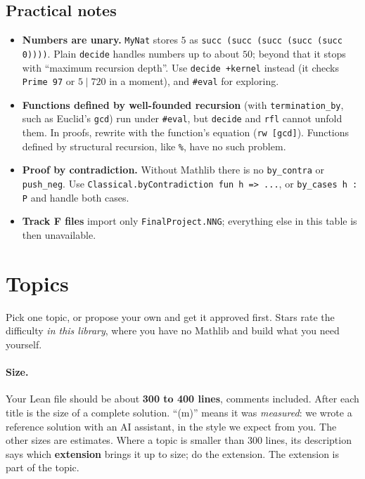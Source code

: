 \documentclass[11pt]{article}
\newcommand{\lean}[1]{\texttt{#1}}
\newcommand{\dvd}{\ensuremath{\mid}}
\begin{document}
\subsection{Practical notes}
\begin{itemize}
\item \textbf{Numbers are unary.} \lean{MyNat} stores $5$ as \lean{succ (succ (succ (succ (succ 0))))}.
  Plain \lean{decide} handles numbers up to about $50$; beyond that it stops with ``maximum
  recursion depth''. Use \lean{decide +kernel} instead (it checks \lean{Prime 97} or
  $5 \dvd 720$ in a moment), and \lean{\#eval} for exploring.
\item \textbf{Functions defined by well-founded recursion} (with \lean{termination\_by}, such as
  Euclid's \lean{gcd}) run under \lean{\#eval}, but \lean{decide} and \lean{rfl} cannot unfold
  them. In proofs, rewrite with the function's equation (\lean{rw [gcd]}). Functions defined by
  structural recursion, like \lean{\%}, have no such problem.
\item \textbf{Proof by contradiction.} Without Mathlib there is no \lean{by\_contra} or
  \lean{push\_neg}. Use \lean{Classical.byContradiction fun h => ...}, or \lean{by\_cases h : P}
  and handle both cases.
\item \textbf{Track F files} import only \lean{FinalProject.NNG}; everything else in this table is
  then unavailable.
\end{itemize}

\section{Topics}

Pick one topic, or propose your own and get it approved first. Stars rate the difficulty
\emph{in this library}, where you have no Mathlib and build what you need yourself.

\paragraph{Size.} Your Lean file should be about \textbf{300 to 400 lines}, comments included.
After each title is the size of a complete solution. ``(m)'' means it was \emph{measured}: we
wrote a reference solution with an AI assistant, in the style we expect from you. The other sizes
are estimates. Where a topic is smaller than 300 lines, its description says which
\textbf{extension} brings it up to size; do the extension. The extension is part of the topic.
\end{document}
